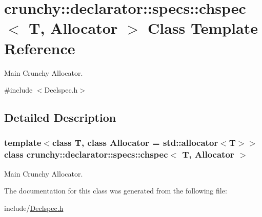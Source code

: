 \hypertarget{classcrunchy_1_1declarator_1_1specs_1_1chspec}{}\section{crunchy\+:\+:declarator\+:\+:specs\+:\+:chspec$<$ T, Allocator $>$ Class Template Reference}
\label{classcrunchy_1_1declarator_1_1specs_1_1chspec}


Main Crunchy Allocator.  




{\ttfamily \#include $<$Declspec.\+h$>$}



\subsection{Detailed Description}
\subsubsection*{template$<$class T, class Allocator = std\+::allocator$<$\+T$>$$>$class crunchy\+::declarator\+::specs\+::chspec$<$ T, Allocator $>$}

Main Crunchy Allocator. 

The documentation for this class was generated from the following file\+:\begin{DoxyCompactItemize}
\item 
include/\hyperlink{_declspec_8h}{Declspec.\+h}\end{DoxyCompactItemize}
